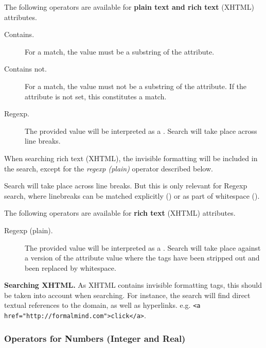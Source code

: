 The following operators are available for \textbf{plain text and rich text} (XHTML) attributes.

\begin{description}
\item[Contains.] For a match, the value must be a substring of the attribute.
\item[Contains not.] For a match, the value must not be a substring of the attribute. If the attribute is not set, this constitutes a match.
\item[Regexp.] The provided value will be interpreted as a .  Search will take place across line breaks.
\end{description}

\begin{info}
When searching rich text (XHTML), the invisible formatting will be included in the search, except for the \textit{regexp (plain)} operator described below.

Search will take place across line breaks.  But this is only relevant for Regexp search, where linebreaks can be matched explicitly () or as part of whitespace ().
\end{info}

The following operators are available for \textbf{rich text} (XHTML) attributes.

\begin{description}
\item[Regexp (plain).] The provided value will be interpreted as a .  Search will take place against a version of the attribute value where the tags have been stripped out and been replaced by whitespace.
\end{description}

\begin{example}
\textbf{Searching XHTML.}  As XHTML contains invisible formatting tags, this should be taken into account when searching.  For instance, the search   will find direct textual references to the domain, as well as hyperlinks. e.g. \texttt{<a href="http://for\-malmind.com">click</a>}.
\end{example}

\subsubsection{Operators for Numbers (Integer and Real)}

